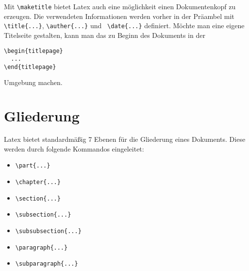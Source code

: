 Mit \verb+\maketitle+ bietet Latex auch eine möglichkeit einen Dokumentenkopf zu erzeugen. Die verwendeten
Informationen werden vorher in der Präambel mit \verb+\title{...}+, \verb+\auther{...}+ und
\verb+ \date{...}+ definiert. Möchte man eine eigene Titelseite gestalten, kann man das zu Beginn des Dokuments
in der 
\begin{verbatim}
\begin{titlepage}
  ...
\end{titlepage}
\end{verbatim}
Umgebung machen.

\section{Gliederung}
Latex bietet standardmäßig 7 Ebenen für die Gliederung eines Dokuments. Diese werden durch folgende Kommandos
eingeleitet:
\begin{itemize}
\item \verb+\part{...}+
\item \verb+\chapter{...}+
\item \verb+\section{...}+
\item \verb+\subsection{...}+
\item \verb+\subsubsection{...}+
\item \verb+\paragraph{...}+
\item \verb+\subparagraph{...}+        
\end{itemize}

